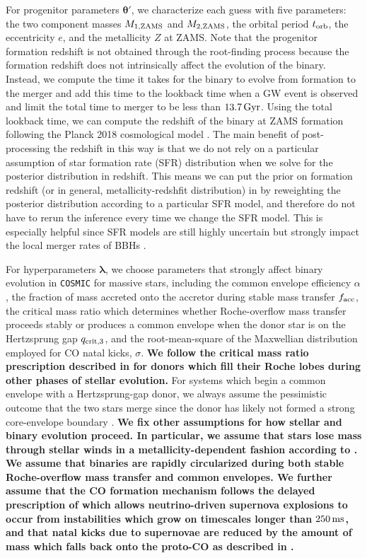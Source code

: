 \documentclass[linenumbers,twocolumn]{aastex631}
\begin{document}
For progenitor parameters $\bm{\theta'}$, we characterize each guess with
five parameters: the two component masses $M_{\rm 1,ZAMS}$ and $M_{\rm 2,ZAMS}$, the orbital period $t_{\rm orb}$,
the eccentricity $e$, and the metallicity $Z$ at ZAMS. Note that the progenitor formation redshift is not
obtained through the root-finding process because the formation redshift does not intrinsically affect
the evolution of the binary. Instead, we compute the time it takes for the binary to evolve from
formation to the merger and add this time to the lookback time when a GW event is observed and limit the total
time to merger to be less than $13.7\,\rm{Gyr}$.
Using the total lookback time, we can compute the redshift of the binary at ZAMS formation following the
Planck 2018 cosmological model \citep{Planck2018}.
The main benefit of post-processing the redshift in this way is that we do not rely on a particular assumption
of star formation rate (SFR) distribution when we solve for the posterior distribution in redshift.
This means we can put the prior on formation redshift (or in general, metallicity-redshfit distribution) in
by reweighting the posterior distribution according to a particular SFR model,
and therefore do not have to rerun the inference every time we change the SFR model. This is especially helpful
since SFR models are still highly uncertain but strongly impact the local merger rates of BBHs \citep[e.g. ][]{Broekgaarden2021}.

For hyperparameters $\bm{\lambda}$, we choose parameters that strongly affect
binary evolution in \texttt{COSMIC} for massive stars, including the common envelope
efficiency $\alpha$, the fraction of mass accreted onto the accretor during stable mass transfer $f_{\rm acc}$,
the critical mass ratio which determines whether Roche-overflow mass transfer
proceeds stably or produces a common envelope when the donor star is on the Hertzsprung gap
$q_{\rm crit,3}$, and the root-mean-square of the Maxwellian distribution
employed for CO natal kicks, $\sigma$. \textbf{We follow the critical mass ratio prescription 
described in \cite{Neijssel2019} for donors which fill their Roche lobes during
 other phases of stellar evolution.} 
For systems which begin a common envelope 
with a Hertzsprung-gap donor, we always assume the pessimistic outcome that the two 
stars merge since the donor has likely not formed a strong core-envelope boundary 
\citep{Ivanova2004, Belczynski2008}. \textbf{We fix other assumptions for how stellar and binary 
evolution proceed. In particular, we assume that stars lose mass through stellar winds 
in a metallicity-dependent 
fashion according to \cite{Vink2001,Vink2005}. We assume that binaries are rapidly circularized
during both stable Roche-overflow mass transfer and common envelopes.
We further assume that the CO formation mechanism follows the delayed 
prescription of \citet{Fryer2012} which allows neutrino-driven supernova explosions to 
occur from instabilities which grow on timescales longer than $250\,\rm{ms}$, 
and that natal kicks due to supernovae are reduced by the amount 
of mass which falls back onto the proto-CO
as described in \citet{Fryer2012}.}
\end{document}
